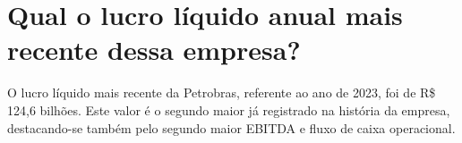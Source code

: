 \section{Qual o lucro líquido anual mais recente dessa empresa?}

O lucro líquido mais recente da Petrobras, referente ao ano de 2023, foi de R\$ 124,6 bilhões. Este valor é o segundo maior já registrado na história da empresa, destacando-se também pelo segundo maior EBITDA e fluxo de caixa operacional.
